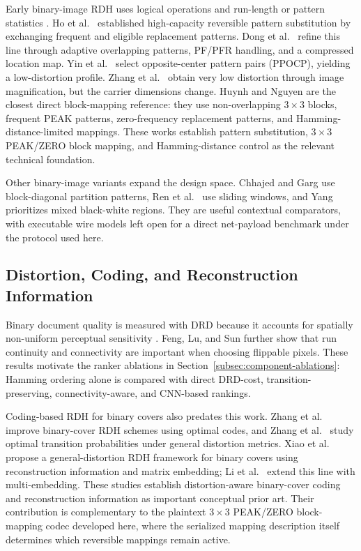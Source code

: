 \documentclass[a4paper,fleqn]{cas-dc}
\newcommand{\RevisionAddBegin}{\begingroup\color{revisionblue}}
\newcommand{\RevisionAddEnd}{\endgroup}
\begin{document}
\RevisionAddBegin
Early binary-image RDH uses logical operations and run-length or pattern
statistics \cite{Xuan2008RunLength}. Ho et al.\ \cite{Ho2009PatternSubstitution} established
high-capacity reversible pattern substitution by exchanging frequent and
eligible replacement patterns. Dong et al.\ \cite{Dong2020Adaptive} refine this
line through adaptive overlapping patterns, PF/PFR handling, and a compressed
location map. Yin et al.\ \cite{Yin2020PPOCP} select opposite-center pattern
pairs (PPOCP), yielding a low-distortion profile. Zhang et al.\
\cite{Zhang2019Magnification} obtain very low distortion through image
magnification, but the carrier dimensions change. Huynh and Nguyen
\cite{Huynh2025BlockMapping} are the closest direct block-mapping reference:
they use non-overlapping $3\times3$ blocks, frequent PEAK patterns,
zero-frequency replacement patterns, and Hamming-distance-limited mappings.
These works establish pattern substitution, $3\times3$ PEAK/ZERO block
mapping, and Hamming-distance control as the relevant technical foundation.
\RevisionAddEnd

\RevisionAddBegin
Other binary-image variants expand the design space. Chhajed and Garg
\cite{Chhajed2023BlockDiagonal} use block-diagonal partition patterns, Ren
et al.\ \cite{Ren2023Sliding} use sliding windows, and Yang
\cite{Yang2023Large} prioritizes mixed black-white regions. They are useful
contextual comparators, with executable wire models left open for a direct
net-payload benchmark under the protocol used here.
\RevisionAddEnd

\RevisionAddBegin
\subsection{Distortion, Coding, and Reconstruction Information}
\RevisionAddEnd

\RevisionAddBegin
Binary document quality is measured with DRD because it accounts for spatially
non-uniform perceptual sensitivity \cite{Lu2004DRD}. Feng, Lu, and Sun
\cite{Feng2015Secure} further show that run continuity and connectivity are
important when choosing flippable pixels. These results motivate the ranker
ablations in Section~\ref{subsec:component-ablations}: Hamming ordering alone
is compared with direct DRD-cost, transition-preserving, connectivity-aware,
and CNN-based rankings.
\RevisionAddEnd

\RevisionAddBegin
Coding-based RDH for binary covers also predates this work. Zhang et al.\
\cite{Zhang2012OptimalCodes} improve binary-cover RDH schemes using optimal
codes, and Zhang et al.\ \cite{Zhang2015OptimalTransition} study optimal
transition probabilities under general distortion metrics. Xiao et al.\
\cite{Xiao2022BinaryCovers} propose a general-distortion RDH framework for
binary covers using reconstruction information and matrix embedding; Li et
al.\ \cite{Li2023MultiEmbedding} extend this line with multi-embedding.
These studies establish distortion-aware binary-cover coding and
reconstruction information as important conceptual prior art. Their
contribution is complementary to the plaintext $3\times3$ PEAK/ZERO
block-mapping codec developed here, where the serialized mapping description
itself determines which reversible mappings remain active.
\RevisionAddEnd
\end{document}
